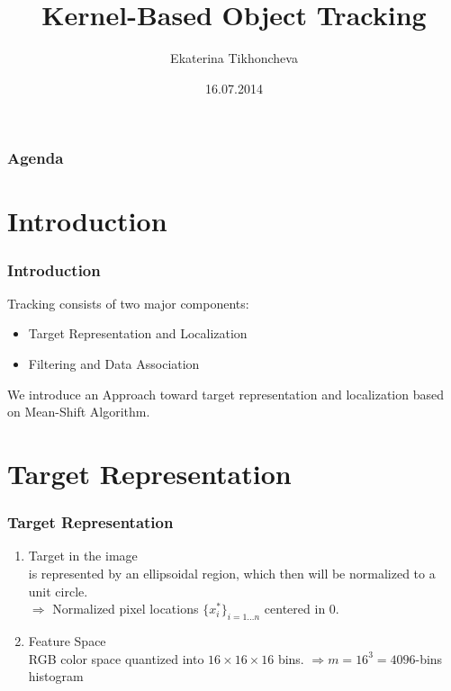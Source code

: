 \documentclass[hyperref={pdfpagelabels=false}]{beamer}
\title{Kernel-Based Object Tracking}
\author{Ekaterina Tikhoncheva}
\date{16.07.2014}
\newcounter{saveenumi}
\newcommand{\seti}{\setcounter{saveenumi}{\value{enumi}}}
\begin{document}
\begin{frame}
\titlepage
\end{frame}

\begin{frame}
\frametitle{Agenda}
\tableofcontents
\end{frame} 


\section{Introduction}
\begin{frame}
\frametitle{Introduction}
Tracking consists of two major components:
\begin{itemize}
\item Target Representation and Localization
\item Filtering and Data Association
\end{itemize}

We introduce an Approach toward target representation and localization based on 
{\color{darkred} Mean-Shift Algorithm}\cite{KernelBasedObjectTracking}.

\end{frame}


\section{Target Representation}
\begin{frame}
\frametitle{Target Representation}
\begin{enumerate}
\item Target in the image \\
	is represented by an {\color{darkred} ellipsoidal region}, which then
	will be normalized to a {\color{darkred} unit circle}.
	\\ $\Rightarrow$ Normalized pixel locations $\{x^{*}_i\}_{i=1\dots n}$ centered in $0$.
\item Feature Space \\
	{\color{darkred} RGB color space} quantized into $16\times 16\times 16$ bins.
	$\Rightarrow m= 16^3 = 4096$-bins histogram
\end{enumerate}

\seti
\end{frame}
\end{document}
